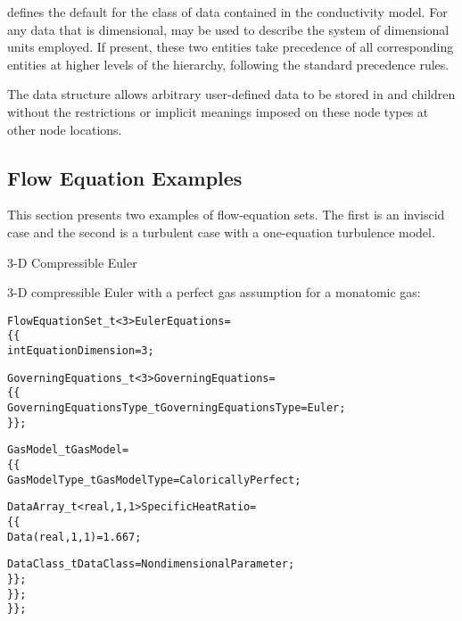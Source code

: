  defines the default for the class of data contained in
the conductivity model.
For any data that is dimensional,  may be used to
describe the system of dimensional units employed.
If present, these two entities take precedence of all corresponding
entities at higher levels of the hierarchy, following the standard
precedence rules.

The  data structure allows arbitrary
user-defined data to be stored in  and
 children without the restrictions or implicit
meanings imposed on these node types at other node locations.

\subsection{Flow Equation Examples}
\label{s:flowexample}

This section presents two examples of flow-equation sets.  The first is
an inviscid case and the second is a turbulent case with a one-equation
turbulence model.

\begin{example}{3-D Compressible Euler}
\label{e:eqn_Euler}

3-D compressible Euler with a perfect gas assumption for a monatomic gas:
\begin{alltt}
  FlowEquationSet\_t<3> EulerEquations = 
    \{\{
    int EquationDimension = 3 ;
    
    GoverningEquations\_t<3> GoverningEquations =
      \{\{
      GoverningEquationsType\_t GoverningEquationsType = Euler ;
      \}\} ;
      
    GasModel\_t GasModel =
      \{\{
      GasModelType\_t GasModelType = CaloricallyPerfect ;
      
      DataArray\_t<real, 1, 1> SpecificHeatRatio =
        \{\{
        Data(real, 1, 1) = 1.667 ;

        DataClass\_t DataClass = NondimensionalParameter ;
        \}\} ;
      \}\} ;
    \}\} ;
\end{alltt}
\end{example}

